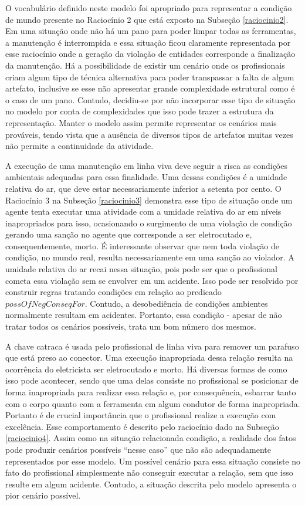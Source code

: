 O vocabulário definido neste modelo foi apropriado para representar a condição de mundo presente no Raciocínio 2 que está exposto na Subseção \ref{raciocinio2}. Em uma situação onde não há um pano para poder limpar todas as ferramentas, a manutenção é interrompida e essa situação ficou claramente representada por esse raciocínio onde a geração da violação de entidades corresponde a finalização da manutenção. Há a possibilidade de existir um cenário onde os profissionais criam algum tipo de técnica alternativa para poder transpassar a falta de algum artefato, inclusive se esse não apresentar grande complexidade estrutural como é o caso de um pano. Contudo, decidiu-se por não incorporar esse tipo de situação no modelo por conta de complexidades que isso pode trazer a estrutura da representação. Manter o modelo assim permite representar os cenários mais prováveis, tendo vista que a ausência de diversos tipos de artefatos muitas vezes não permite a continuidade da atividade.    

A execução de uma manutenção em linha viva deve seguir a risca as condições ambientais adequadas para essa finalidade. Uma dessas condições é a umidade relativa do ar, que deve estar necessariamente inferior a setenta por cento. O Raciocínio 3 na Subseção \ref{raciocinio3} demonstra esse tipo de situação onde um agente tenta executar uma atividade com a umidade relativa do ar em níveis inapropriados para isso, ocasionando o surgimento de uma violação de condição gerando uma sanção no agente que corresponde a ser eletrocutado e, consequentemente, morto. É interessante observar que nem toda violação de condição, no mundo real, resulta necessariamente em uma sanção ao violador. A umidade relativa do ar recai nessa situação, pois pode ser que o profissional cometa essa violação sem se envolver em um acidente. Isso pode ser resolvido por construir regras tratando condições em relação ao predicado $possOfNegConseqFor$. Contudo, a desobediência de condições ambientes normalmente resultam em acidentes. Portanto, essa condição - apesar de não tratar todos os cenários possíveis, trata um bom número dos mesmos.

A chave catraca é usada pelo profissional de linha viva para remover um parafuso que está preso ao conector. Uma execução inapropriada dessa relação resulta na ocorrência do eletricista ser eletrocutado e morto. Há diversas formas de como isso pode acontecer, sendo que uma delas consiste no profissional se posicionar de forma inapropriada para realizar essa relação e, por consequência, esbarrar tanto com o corpo quanto com a ferramenta em algum condutor de forma inapropriada. Portanto é de crucial importância que o profissional realize a execução com excelência. Esse comportamento é descrito pelo raciocínio dado na Subseção \ref{raciocinio4}. Assim como na situação relacionada condição, a realidade dos fatos pode produzir cenários possíveis ``nesse caso'' que não são adequadamente representados por esse modelo. Um possível cenário para essa situação consiste no fato do profissional simplesmente não conseguir executar a relação, sem que isso resulte em algum acidente. Contudo, a situação descrita pelo modelo apresenta o pior cenário possível. 


